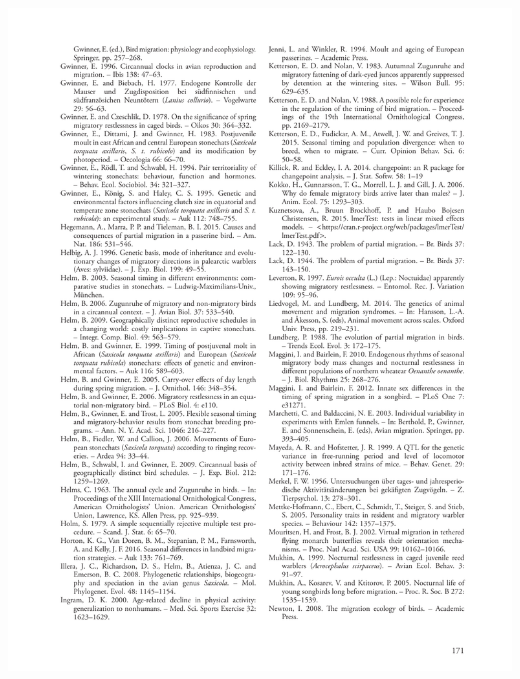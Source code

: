 \documentclass[a4paper, twoside]{templates/ociamthesis}
\begin{document}
\begin{center}\includegraphics[width=1\linewidth]{pdf_chapters/zug/zug_crop_Part17} \end{center}
\end{document}
